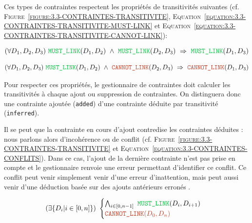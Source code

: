 		Ces types de contraintes respectent les propriétés de transitivités suivantes (cf. \textsc{Figure~\ref{figure:3.3-CONTRAINTES-TRANSITIVITE}}, \textsc{Equation~\ref{equation:3.3-CONTRAINTES-TRANSITIVITE-MUST-LINK}} et \textsc{Equation~\ref{equation:3.3-CONTRAINTES-TRANSITIVITE-CANNOT-LINK}}):
		
		\begin{equation}
			\label{equation:3.3-CONTRAINTES-TRANSITIVITE-MUST-LINK}
			(\forall D_1,D_2,D_3)
			~\textcolor{colorDarkPastelGreen}{\texttt{MUST\_LINK}}(D_1,D_2)
			~\wedge~\textcolor{colorDarkPastelGreen}{\texttt{MUST\_LINK}}(D_2,D_3)
			~\Rightarrow~\textcolor{colorDarkPastelGreen}{\texttt{MUST\_LINK}}(D_1,D_3)
		\end{equation}
		
		\begin{equation}
			\label{equation:3.3-CONTRAINTES-TRANSITIVITE-CANNOT-LINK}
			(\forall D_1,D_2,D_3)
			~\textcolor{colorDarkPastelGreen}{\texttt{MUST\_LINK}}(D_1,D_2)
			~\wedge~\textcolor{colorDarkPastelRed}{\texttt{CANNOT\_LINK}}(D_2,D_3)
			~\Rightarrow~\textcolor{colorDarkPastelRed}{\texttt{CANNOT\_LINK}}(D_1,D_3)
		\end{equation}
		
		Pour respecter ces propriétés, le gestionnaire de contraintes doit calculer les transitivités à chaque ajout ou suppression de contraintes. On distinguera donc une contrainte ajoutée (\texttt{added}) d'une contrainte déduite par transitivité (\texttt{inferred}).
		
		Il se peut que la contrainte en cours d'ajout contredise les contraintes déduites : nous parlons alors d'incohérence ou de conflit (cf. \textsc{Figure~\ref{figure:3.3-CONTRAINTES-TRANSITIVITE}} et \textsc{Equation~\ref{equation:3.3-CONTRAINTES-CONFLITS}}).
		Dans ce cas, l'ajout de la dernière contrainte n'est pas prise en compte et le gestionnaire renvoie une erreur permettant d'identifier ce conflit.
		Ce conflit peut venir simplement venir d'une erreur d’inattention, mais peut aussi venir d'une déduction basée sur des ajouts antérieurs erronés .
		
		\begin{equation}
			\label{equation:3.3-CONTRAINTES-CONFLITS}
			(\exists \{D_i | i\in[0,n]\})~
			\begin{cases}
				\bigwedge_{i\in[0,n-1]}~\textcolor{colorDarkPastelGreen}{\texttt{MUST\_LINK}}(D_i,D_{i+1})  \\
				\textcolor{colorDarkPastelRed}{\texttt{CANNOT\_LINK}(D_0,D_n)}
			\end{cases}
		\end{equation}
		
